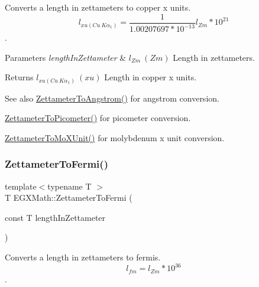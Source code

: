 Converts a length in zettameters to copper x units. \[ l_{xu(Cu\ K\alpha_1)}= \frac{1}{1.00207697*10^{-13}} l_{Zm} * 10^{21}\]. 


\begin{DoxyParams}{Parameters}
{\em length\+In\+Zettameter} & $ l_{Zm}\ (Zm)$ Length in zettameters. \\
\hline
\end{DoxyParams}
\begin{DoxyReturn}{Returns}
$ l_{xu(Cu\ K\alpha_1)}\ (xu)$ Length in copper x units. 
\end{DoxyReturn}
\begin{DoxySeeAlso}{See also}
\mbox{\hyperlink{group___e_g_x_math-_conversions-_length_conversions-_s_i-_zettameter-_non-_s_i_ga49d813ff9592fc1fc9a184436d0849fc}{Zettameter\+To\+Angstrom()}} for angstrom conversion. 

\mbox{\hyperlink{group___e_g_x_math-_conversions-_length_conversions-_s_i-_zettameter-_s_i_gae7835234c6727bbfd1e9ad40c54a4740}{Zettameter\+To\+Picometer()}} for picometer conversion. 

\mbox{\hyperlink{group___e_g_x_math-_conversions-_length_conversions-_s_i-_zettameter-_non-_s_i_ga10039261b7de3417e69110a56312b9ef}{Zettameter\+To\+Mo\+X\+Unit()}} for molybdenum x unit conversion. 
\end{DoxySeeAlso}
\mbox{\label{group___e_g_x_math-_conversions-_length_conversions-_s_i-_zettameter-_non-_s_i_ga791b0a401fe813fe4e6a34490f12a817}} 
\subsubsection{\texorpdfstring{Zettameter\+To\+Fermi()}{ZettameterToFermi()}}
{\footnotesize\ttfamily template$<$typename T $>$ \\
T E\+G\+X\+Math\+::\+Zettameter\+To\+Fermi (\begin{DoxyParamCaption}\item[{const T}]{length\+In\+Zettameter }\end{DoxyParamCaption})}



Converts a length in zettameters to fermis. \[ l_{fm}=l_{Zm} * 10^{36} \]. 


